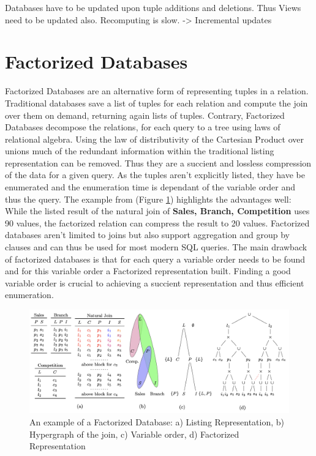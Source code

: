 \documentclass[abstracton,12pt]{scrreprt}
\begin{document}
Databases have to be updated upon tuple additions and deletions. Thus Views need to be updated also. Recomputing is slow. -> Incremental updates

\section{Factorized Databases}
Factorized Databases are an alternative form of representing tuples in a relation. Traditional databases save a list of tuples for each relation and compute the join over them on demand, returning again lists of tuples. Contrary, Factorized Databases decompose the relations, for each query to a tree using laws of relational algebra. Using the law of distributivity of the Cartesian Product over unions much of the redundant information within the traditional listing representation can be removed. Thus they are a succient and lossless compression of the data for a given query. As the tuples aren't explicitly listed, they have be enumerated and the enumeration time is dependant of the variable order and thus the query. 
The example from \cite{FactorizedDB} (Figure \ref{fig:factorizedDBExample}) highlights the advantages well: While the listed result of the natural join of \textbf{Sales, Branch, Competition} uses 90 values, the factorized relation can compress the result to 20 values. Factorized databases aren't limited to joins but also support aggregation and group by clauses and can thus be used for most modern SQL queries.
The main drawback of factorized databases is that for each query a variable order needs to be found and for this variable order a Factorized representation built. Finding a good variable order is crucial to achieving a succient representation and thus efficient enumeration. \cite{FactorizedDB}
\begin{figure}
	\includegraphics[width=\linewidth]{FactorizedExample.png}
	\caption{An example of a Factorized Database: a) Listing Representation, b) Hypergraph of the join, c) Variable order, d) Factorized Representation \cite{FactorizedDB}}
	\label{fig:factorizedDBExample}
\end{figure}
\end{document}
